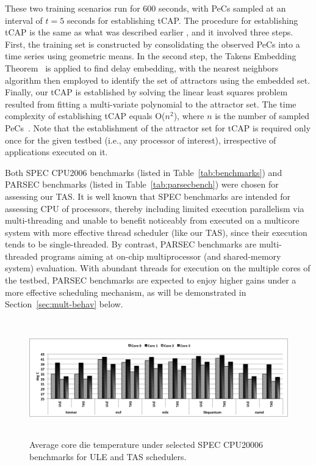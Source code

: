 \documentclass[times, 10pt,twocolumn]{IEEEtran}
\begin{document}
These two training scenarios run for 600 seconds, with PeCs sampled at
an interval of $t=5$ seconds for establishing tCAP.  The procedure for
establishing tCAP is the same as what was described earlier
\cite{Lewis2010}, and it involved three steps. First, the training set
is constructed by consolidating the observed PeCs into a time series
using geometric means.  In the second step, the Takens Embedding
Theorem~\cite{Su2010} is applied to find delay embedding, with the
nearest neighbors algorithm then employed to identify the set of
attractors using the embedded set.  Finally, our tCAP is established by
solving the linear least squares problem resulted from fitting a
multi-variate polynomial to the attractor set.  The time complexity of
establishing tCAP equals O($n ^2$), where $n$ is the number of sampled
PeCs~\cite{Lewis2010}.  Note that the establishment of the attractor set
for tCAP is required only once for the given testbed (i.e., any
processor of interest), irrespective of applications executed on it.

Both SPEC CPU2006 benchmarks (listed in Table~\ref{tab:benchmarks}) and
PARSEC benchmarks (listed in Table~\ref{tab:parsecbench}) were chosen
for assessing our TAS.  It is well known that SPEC benchmarks are
intended for assessing CPU of processors, thereby including limited
execution parallelism via multi-threading and unable to benefit
noticeably from executed on a multicore system with more effective
thread scheduler (like our TAS), since their execution tends to be
single-threaded.  By contrast, PARSEC benchmarks are multi-threaded
programs aiming at on-chip multiprocessor (and shared-memory system)
evaluation.  With abundant threads for execution on the multiple cores
of the testbed, PARSEC benchmarks are expected to enjoy higher gains under
a more effective scheduling mechanism, as will be demonstrated in
Section~\ref{sec:mult-behav} below.

\begin{figure}[!tbhp] 
\centering
\includegraphics[width=1.0\linewidth,height=2in]{graphics/speccputemp}
\caption{Average core die temperature under selected SPEC CPU20006
benchmarks for ULE and TAS schedulers.}
\label{fig:ubenchmarks}
\end{figure}
\end{document}
